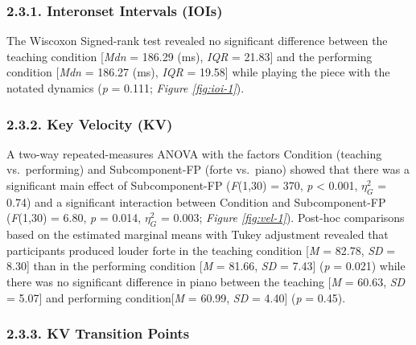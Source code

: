 \documentclass[
  english,
  man,floatsintext]{apa6}
\begin{document}
\hypertarget{interonset-intervals-iois-1}{%
\subsubsection{2.3.1. Interonset Intervals (IOIs)}\label{interonset-intervals-iois-1}}

The Wiscoxon Signed-rank test revealed no significant difference between the teaching condition {[}\emph{Mdn} = 186.29 (ms), \emph{IQR} = 21.83{]} and the performing condition {[}\emph{Mdn} = 186.27 (ms), \emph{IQR} = 19.58{]} while playing the piece with the notated dynamics (\emph{p} = 0.111; \emph{Figure \ref{fig:ioi-1}}).

\hypertarget{key-velocity-kv-1}{%
\subsubsection{2.3.2. Key Velocity (KV)}\label{key-velocity-kv-1}}

A two-way repeated-measures ANOVA with the factors Condition (teaching vs.~performing) and Subcomponent-FP (forte vs.~piano) showed that there was a significant main effect of Subcomponent-FP (\emph{F}(1,30) = 370, \emph{p} \textless{} 0.001, \(\eta_G^2\) = 0.74) and a significant interaction between Condition and Subcomponent-FP (\emph{F}(1,30) = 6.80, \emph{p} = 0.014, \(\eta_G^2\) = 0.003; \emph{Figure \ref{fig:vel-1}}). Post-hoc comparisons based on the estimated marginal means with Tukey adjustment revealed that participants produced louder forte in the teaching condition {[}\emph{M} = 82.78, \emph{SD} = 8.30{]} than in the performing condition {[}\emph{M} = 81.66, \emph{SD} = 7.43{]} (\emph{p} = 0.021) while there was no significant difference in piano between the teaching {[}\emph{M} = 60.63, \emph{SD} = 5.07{]} and performing condition{[}\emph{M} = 60.99, \emph{SD} = 4.40{]} (\emph{p} = 0.45).

\hypertarget{kv-transition-points}{%
\subsubsection{2.3.3. KV Transition Points}\label{kv-transition-points}}
\end{document}
